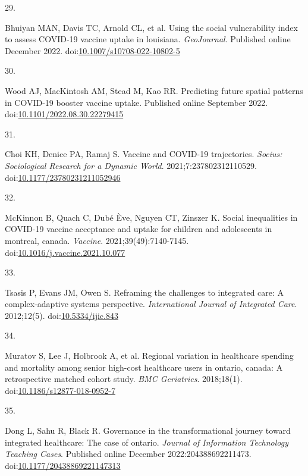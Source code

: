 \documentclass[
]{article}
\newlength{\cslhangindent}
\newlength{\csllabelwidth}
\newlength{\cslentryspacingunit} %
\newenvironment{CSLReferences}[2] %
 {%
  \setlength{\parindent}{0pt}
  \ifodd #1
  \let\oldpar\par
  \def\par{\hangindent=\cslhangindent\oldpar}
  \fi
  \setlength{\parskip}{#2\cslentryspacingunit}
 }%
 {}
\newcommand{\CSLLeftMargin}[1]{\parbox[t]{\csllabelwidth}{#1}}
\newcommand{\CSLRightInline}[1]{\parbox[t]{\linewidth - \csllabelwidth}{#1}\break}
\begin{document}
\begin{CSLReferences}{0}{0}
\leavevmode{}%
\CSLLeftMargin{29. }%
\CSLRightInline{Bhuiyan MAN, Davis TC, Arnold CL, et al. Using the
social vulnerability index to assess {COVID}-19 vaccine uptake in
louisiana. \emph{{GeoJournal}}. Published online December 2022.
doi:\href{https://doi.org/10.1007/s10708-022-10802-5}{10.1007/s10708-022-10802-5}}

\leavevmode{}%
\CSLLeftMargin{30. }%
\CSLRightInline{Wood AJ, MacKintosh AM, Stead M, Kao RR. Predicting
future spatial patterns in {COVID}-19 booster vaccine uptake. Published
online September 2022.
doi:\href{https://doi.org/10.1101/2022.08.30.22279415}{10.1101/2022.08.30.22279415}}

\leavevmode{}%
\CSLLeftMargin{31. }%
\CSLRightInline{Choi KH, Denice PA, Ramaj S. Vaccine and {COVID}-19
trajectories. \emph{Socius: Sociological Research for a Dynamic World}.
2021;7:237802312110529.
doi:\href{https://doi.org/10.1177/23780231211052946}{10.1177/23780231211052946}}

\leavevmode{}%
\CSLLeftMargin{32. }%
\CSLRightInline{McKinnon B, Quach C, Dubé Ève, Nguyen CT, Zinszer K.
Social inequalities in {COVID}-19 vaccine acceptance and uptake for
children and adolescents in montreal, canada. \emph{Vaccine}.
2021;39(49):7140-7145.
doi:\href{https://doi.org/10.1016/j.vaccine.2021.10.077}{10.1016/j.vaccine.2021.10.077}}

\leavevmode{}%
\CSLLeftMargin{33. }%
\CSLRightInline{Tsasis P, Evans JM, Owen S. Reframing the challenges to
integrated care: A complex-adaptive systems perspective.
\emph{International Journal of Integrated Care}. 2012;12(5).
doi:\href{https://doi.org/10.5334/ijic.843}{10.5334/ijic.843}}

\leavevmode{}%
\CSLLeftMargin{34. }%
\CSLRightInline{Muratov S, Lee J, Holbrook A, et al. Regional variation
in healthcare spending and mortality among senior high-cost healthcare
users in ontario, canada: A retrospective matched cohort study.
\emph{{BMC} Geriatrics}. 2018;18(1).
doi:\href{https://doi.org/10.1186/s12877-018-0952-7}{10.1186/s12877-018-0952-7}}

\leavevmode{}%
\CSLLeftMargin{35. }%
\CSLRightInline{Dong L, Sahu R, Black R. Governance in the
transformational journey toward integrated healthcare: The case of
ontario. \emph{Journal of Information Technology Teaching Cases}.
Published online December 2022:204388692211473.
doi:\href{https://doi.org/10.1177/20438869221147313}{10.1177/20438869221147313}}


\end{CSLReferences}
\end{document}
